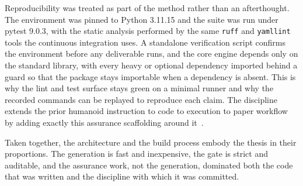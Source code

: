 Reproducibility was treated as part of the method rather than an afterthought. The
environment was pinned to Python 3.11.15 and the suite was run under pytest
9.0.3, with the static analysis performed by the same \texttt{ruff} and
\texttt{yamllint} tools the continuous integration uses. A standalone verification
script confirms the environment before any deliverable runs, and the core engine
depends only on the standard library, with every heavy or optional dependency
imported behind a guard so that the package stays importable when a dependency is
absent. This is why the lint and test surface stays green on a minimal runner and
why the recorded commands can be replayed to reproduce each claim. The discipline
extends the prior humanoid instruction to code to execution to paper workflow by
adding exactly this assurance scaffolding around it~\cite{anthropicclaudecodeweb}.

Taken together, the architecture and the build process embody the thesis in their
proportions. The generation is fast and inexpensive, the gate is strict and
auditable, and the assurance work, not the generation, dominated both the code
that was written and the discipline with which it was committed.
